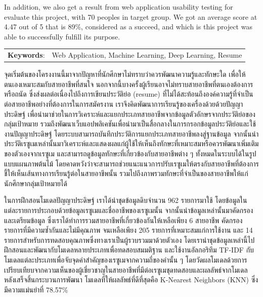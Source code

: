 \documentclass[12pt,oneside,openright,a4paper]{cpe-thai-project}
\begin{document}
In addition, we also get a result from web application usability testing for evaluate this project, with 70 peoples in target group.
We got an average score at 4.47 out of 5 that is 89\%, considered as a succeed, and which is this project 
was able to successfully fulfill its purpose.

\begin{flushleft}
    \begin{tabular*}{\textwidth}{@{}lp{}}
        \textbf{Keywords}: & Web Application, Machine Learning, Deep Learning, Resume
    \end{tabular*}
\end{flushleft}
\endabstract

\thaiabstract

จุดเริ่มต้นของโครงงานนี้มาจากปัญหาที่นักศึกษาไม่ทราบว่าควรพัฒนาความรู้และทักษะใด เพื่อให้ตนเองเหมาะสมกับสายอาชีพที่สนใจ 
นอกจากนี้บางครั้งผู้เรียนอาจไม่ทราบสายอาชีพที่ตนเองต้องการหรือถนัด ซึ่งส่งผลต่อเนื่องไปถึงการเขียนประวัติย่อ (resume) 
ที่ไม่ได้สะท้อนถึงองค์ความรู้ที่จำเป็นต่อสายอาชีพอย่างที่ต้องการในการสมัครงาน เราจึงคิดพัฒนาการเรียนรู้ของเครื่องด้วยด้วยปัญญาประดิษฐ์ 
เพื่อนำมาช่วยในการวิเคราะห์และแยกประเภทสายอาชีพจากข้อมูลตัวอักษรจากประวัติย่อของกลุ่มเป้าหมาย 
รวมถึงพัฒนาเว็บแอปพลิเคชันเพื่อนำมาเป็นสื่อกลางในการกรอกข้อมูลประวัติย่อและใช้งานปัญญาประดิษฐ์ โดยระบบสามารถบันทึกประวัติการแยกประเภทสายอาชีพลงสู่ฐานข้อมูล 
จากนั้นนำประวัติเรซูเมเหล่านั้นมาวิเคราะห์และแสดงผลแก่ผู้ใช้ให้เห็นถึงทักษะที่เหมาะสมหรือควรพัฒนาเพิ่มเติมของตัวเองจากเรซูเม 
และสามารถดูข้อมูลทักษะที่เกี่ยวข้องกับสายอาชีพต่าง ๆ ทั้งหมดในระบบได้ในรูปแบบแผนภาพต้นไม้ โดยคาดหวังว่าจะสามารถช่วยแนะแนวการปรับเรซูเมให้ตรงกับสายอาชีพที่ต้องการ 
ชี้ให้เห็นเส้นทางการเรียนรู้ต่อในสายอาชีพนั้น รวมไปถึงภาพรวมทักษะที่จำเป็นของสายอาชีพให้แก่นักศึกษากลุ่มเป้าหมายได้ 

ในการฝึกสอนโมเดลปัญญาประดิษฐ์ เราได้นำชุดข้อมูลดิบจำนวน 962 รายการมาใช้ โดยข้อมูลในแต่ละรายการประกอบด้วยข้อมูลเรซูเมและชื่ออาชีพของเรซูเมนั้น 
จากนั้นนำข้อมูลเหล่านั้นมาคัดกรองและเตรียมข้อมูล ซึ่งเราได้ทำการรวมสายอาชีพที่เกี่ยวข้องกันให้เหลือเพียง 6 สายอาชีพ คัดกรองรายการที่มีความซ้ำกันและไม่มีคุณภาพ 
จนเหลือเพียง 205 รายการที่เหมาะสมแก่การใช้งาน และ 14 รายการสำหรับการทดสอบคุณภาพซึ่งทางเราเป็นผู้รวบรวมมาด้วยตัวเอง 
โดยเรานำชุดข้อมูลเหล่านี้ไปฝึกสอนและพัฒนากับโมเดลหลายประเภทเพื่อทดสอบสมมติฐาน และใช้งานอัลกอริทึม TF-IDF 
กับโมเดลแต่ละประเภทเพื่อจับจุดคำสำคัญของเรซูเมจากความถี่ของคำนั้น ๆ 
โดยวัดผลโมเดลด้วยการเปรียบเทียบจากความเห็นของผู้เชี่ยวชาญในสายอาชีพที่มีต่อเรซูเมชุดทดสอบและผลลัพธ์จากโมเดล หลังเสร็จสิ้นกระบวนการพัฒนา 
โมเดลที่ให้ผลลัพธ์ที่ดีที่สุดคือ K-Nearest Neighbors (KNN) ซึ่งมีความแม่นยำที่ 78.57\%
\end{document}
